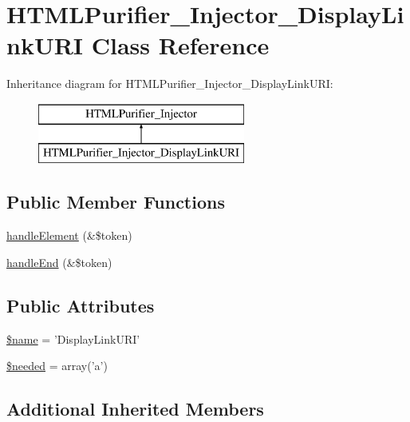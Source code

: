 \hypertarget{classHTMLPurifier__Injector__DisplayLinkURI}{\section{H\+T\+M\+L\+Purifier\+\_\+\+Injector\+\_\+\+Display\+Link\+U\+R\+I Class Reference}
\label{classHTMLPurifier__Injector__DisplayLinkURI}
}
Inheritance diagram for H\+T\+M\+L\+Purifier\+\_\+\+Injector\+\_\+\+Display\+Link\+U\+R\+I\+:\begin{figure}[H]
\begin{center}
\leavevmode
\includegraphics[height=2.000000cm]{classHTMLPurifier__Injector__DisplayLinkURI}
\end{center}
\end{figure}
\subsection*{Public Member Functions}
\begin{DoxyCompactItemize}
\item 
\hyperlink{classHTMLPurifier__Injector__DisplayLinkURI_a245a129f20f87be0077051ec93db3636}{handle\+Element} (\&\$token)
\item 
\hyperlink{classHTMLPurifier__Injector__DisplayLinkURI_a2385ea2991a1719e27aedf9294964c53}{handle\+End} (\&\$token)
\end{DoxyCompactItemize}
\subsection*{Public Attributes}
\begin{DoxyCompactItemize}
\item 
\hyperlink{classHTMLPurifier__Injector__DisplayLinkURI_aae886996782515047aa0f0236efa4ed8}{\$name} = 'Display\+Link\+U\+R\+I'
\item 
\hyperlink{classHTMLPurifier__Injector__DisplayLinkURI_a8aaf875d45aba11b54a9327c5ca9ad9e}{\$needed} = array('a')
\end{DoxyCompactItemize}
\subsection*{Additional Inherited Members}


